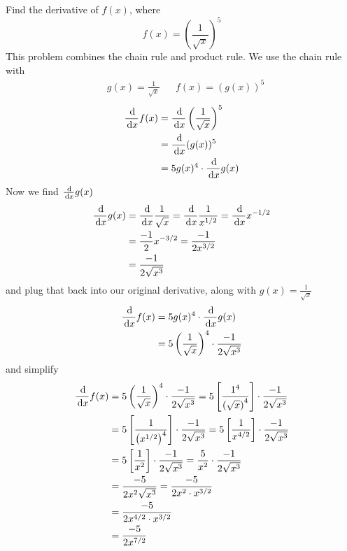 \begin{ex}
  Find the derivative of $f(x)$, where
  $$ f(x)=\left(\frac{1}{\sqrt{x}}\right)^5 $$
  This problem combines the chain rule and product rule. We use the chain rule with
  \begin{align*}
    & g(x)=\frac{1}{\sqrt{x}}
    & & f(x)={(g(x))^5}
  \end{align*}
  \begin{align*}
    \frac{\,\mathrm{d}}{\,\mathrm{d} x} f(x)&=\frac{\,\mathrm{d}}{\,\mathrm{d} x} \left(\frac{1}{\sqrt{x}}\right)^5 \\
      &= \frac{\,\mathrm{d}}{\,\mathrm{d} x} {(g(x))^5} \\
      &= 5g(x)^4 \cdot \frac{\,\mathrm{d}}{\,\mathrm{d} x} g(x)
  \end{align*}
  Now we find $ \frac{\,\mathrm{d}}{\,\mathrm{d} x} g(x) $
  \begin{align*}
    \frac{\,\mathrm{d}}{\,\mathrm{d} x} g(x) &= \frac{\,\mathrm{d}}{\,\mathrm{d} x} \frac{1}{\sqrt{x}} =\frac{\,\mathrm{d}}{\,\mathrm{d} x} \frac{1}{x^{1/2}} =\frac{\,\mathrm{d}}{\,\mathrm{d} x} x^{-1/2} \\
      &=\frac{-1}{2}x^{-3/2} =\frac{-1}{2x^{3/2}} \\
      &=\frac{-1}{2\sqrt{x^3}}
  \end{align*}
  and plug that back into our original derivative, along with $g(x)=\frac{1}{\sqrt{x}}$
  \begin{align*}
    \frac{\,\mathrm{d}}{\,\mathrm{d} x} f(x)&=5g(x)^4 \cdot \frac{\,\mathrm{d}}{\,\mathrm{d} x} g(x) \\
      &=5\left(\frac{1}{\sqrt{x}}\right)^4\cdot \frac{-1}{2\sqrt{x^3}}
  \end{align*}
  and simplify
  \begin{align*}
    \frac{\,\mathrm{d}}{\,\mathrm{d} x} f(x)&=5\left(\frac{1}{\sqrt{x}}\right)^4\cdot \frac{-1}{2\sqrt{x^3}} =5\left[\frac{1^4}{\left(\sqrt{x}\right)^4}\right] \cdot \frac{-1}{2\sqrt{x^3}} \\
    &=5\left[\frac{1}{\left(x^{1/2}\right)^4}\right] \cdot \frac{-1}{2\sqrt{x^3}}=5\left[\frac{1}{x^{4/2}}\right] \cdot \frac{-1}{2\sqrt{x^3}} \\
    &=5\left[\frac{1}{x^2}\right] \cdot \frac{-1}{2\sqrt{x^3}}=\frac{5}{x^2} \cdot \frac{-1}{2\sqrt{x^3}} \\
    &=\frac{-5}{2x^2\sqrt{x^3}} =\frac{-5}{2x^2\cdot x^{3/2}} \\
    &=\frac{-5}{2x^{4/2}\cdot x^{3/2}}\\
    &=\frac{-5}{2x^{7/2}} \\
  \end{align*}
\end{ex}
